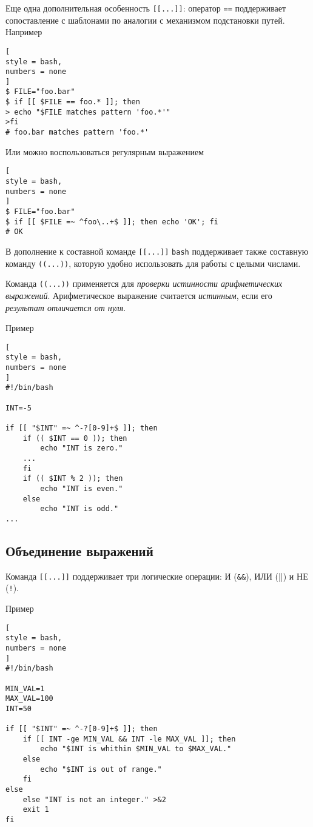 \documentclass[%
	11pt,
	a4paper,
	utf8,
		]{article}
\begin{document}
Еще одна дополнительная особенность \verb|[[...]]|: оператор \verb|==| поддерживает сопоставление с шаблонами по аналогии с механизмом подстановки путей. Например
\begin{lstlisting}[
style = bash,
numbers = none
]
$ FILE="foo.bar"
$ if [[ $FILE == foo.* ]]; then
> echo "$FILE matches pattern 'foo.*'"
>fi
# foo.bar matches pattern 'foo.*'
\end{lstlisting}

Или можно воспользоваться регулярным выражением
\begin{lstlisting}[
style = bash,
numbers = none
]
$ FILE="foo.bar"
$ if [[ $FILE =~ ^foo\..+$ ]]; then echo 'OK'; fi
# OK
\end{lstlisting}

В дополнение к составной команде \verb|[[...]]| \texttt{bash} поддерживает также составную команду \verb|((...))|, которую удобно использовать для работы с целыми числами.

Команда \verb|((...))| применяется для \emph{проверки истинности арифметических выражений}. Арифметическое выражение считается \emph{истинным}, если его \emph{результат отличается от нуля}.

Пример
\begin{lstlisting}[
style = bash,
numbers = none
]
#!/bin/bash

INT=-5

if [[ "$INT" =~ ^-?[0-9]+$ ]]; then
    if (( $INT == 0 )); then
        echo "INT is zero."
    ...
    fi
    if (( $INT % 2 )); then
        echo "INT is even."
    else
        echo "INT is odd."
...
\end{lstlisting}

\subsection{Объединение выражений}

Команда \verb|[[...]]| поддерживает три логические операции: И (\verb|&&|), ИЛИ (\verb||||) и НЕ (\verb|!|).

Пример
\begin{lstlisting}[
style = bash,
numbers = none
]
#!/bin/bash

MIN_VAL=1
MAX_VAL=100
INT=50

if [[ "$INT" =~ ^-?[0-9]+$ ]]; then
    if [[ INT -ge MIN_VAL && INT -le MAX_VAL ]]; then
        echo "$INT is whithin $MIN_VAL to $MAX_VAL."
    else
        echo "$INT is out of range."
    fi
else
    else "INT is not an integer." >&2
    exit 1
fi
\end{lstlisting}
\end{document}
